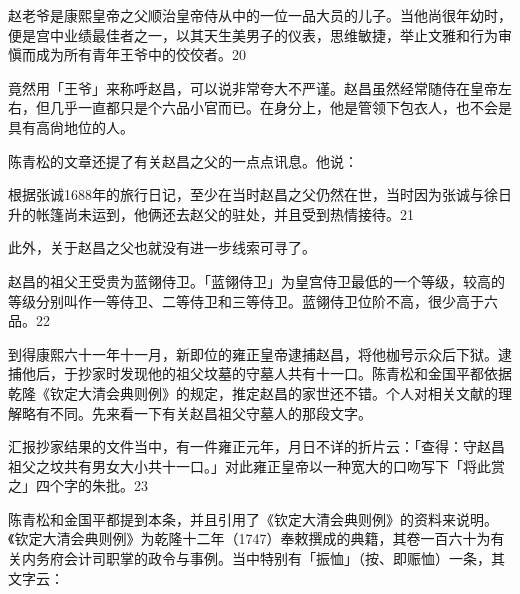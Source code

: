 \begin{BookQuote}
赵老爷是康熙皇帝之父顺治皇帝侍从中的一位一品大员的儿子。当他尚很年幼时，便是宫中业绩最佳者之一，以其天生美男子的仪表，思维敏捷，举止文雅和行为审愼而成为所有青年王爷中的佼佼者。20
\end{BookQuote}

\vfill
\begin{BookNotes}
\end{BookNotes}

\noindent 竟然用「王爷」来称呼赵昌，可以说非常夸大不严谨。赵昌虽然经常随侍在皇帝左右，但几乎一直都只是个六品小官而已。在身分上，他是管领下包衣人，也不会是具有高尙地位的人。

陈青松的文章还提了有关赵昌之父的一点点讯息。他说：

\begin{BookQuote}
根据张诚1688年的旅行日记，至少在当时赵昌之父仍然在世，当时因为张诚与徐日升的帐篷尚未运到，他俩还去赵父的驻处，并且受到热情接待。21
\end{BookQuote}

此外，关于赵昌之父也就没有进一步线索可寻了。

赵昌的祖父王受贵为蓝翎侍卫。「蓝翎侍卫」为皇宫侍卫最低的一个等级，较高的等级分别叫作一等侍卫、二等侍卫和三等侍卫。蓝翎侍卫位阶不高，很少高于六品。22

到得康熙六十一年十一月，新即位的雍正皇帝逮捕赵昌，将他枷号示众后下狱。逮捕他后，于抄家时发现他的祖父坟墓的守墓人共有十一口。陈青松和金国平都依据乾隆《钦定大清会典则例》的规定，推定赵昌的家世还不错。个人对相关文献的理解略有不同。先来看一下有关赵昌祖父守墓人的那段文字。

汇报抄家结果的文件当中，有一件雍正元年，月日不详的折片云：「查得：守赵昌祖父之坟共有男女大小共十一口。」对此雍正皇帝以一种宽大的口吻写下「将此赏之」四个字的朱批。23

陈青松和金国平都提到本条，并且引用了《钦定大清会典则例》的资料来说明。《钦定大清会典则例》为乾隆十二年（1747）奉敕撰成的典籍，其卷一百六十为有关内务府会计司职掌的政令与事例。当中特别有「振恤」（按、即赈恤）一条，其文字云：

